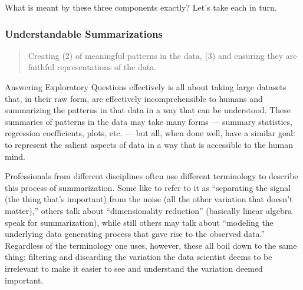 \documentclass[letterpaper,10pt,english]{jupyterBook}
\begin{document}
\sphinxAtStartPar
{}

\sphinxAtStartPar
What is meant by these three components exactly? Let’s take each in turn.


\subsubsection{Understandable Summarizations}
\label{\detokenize{30_questions/15_answering_exploratory_questions:understandable-summarizations}}\begin{quote}

\sphinxAtStartPar
Creating  (2) of meaningful patterns in the data, (3) and ensuring they are faithful representations of the data.
\end{quote}

\sphinxAtStartPar
Answering Exploratory Questions effectively is all about taking large datasets that, in their raw form, are effectively incomprehensible to humans and summarizing the patterns in that data in a way that can be understood. These summaries of patterns in the data may take many forms — summary statistics, regression coefficients, plots, etc. — but all, when done well, have a similar goal: to represent the salient aspects of data in a way that is accessible to the human mind.

\sphinxAtStartPar
Professionals from different disciplines often use different terminology to describe this process of summarization. Some like to refer to it as “separating the signal (the thing that’s important) from the noise (all the other variation that doesn’t matter),” others talk about “dimensionality reduction” (basically linear algebra speak for summarization), while still others may talk about “modeling the underlying data generating process that gave rise to the observed data.” Regardless of the terminology one uses, however, these all boil down to the same thing: filtering and discarding the variation the data scientist deems to be irrelevant to make it easier to see and understand the variation deemed important.
\end{document}
